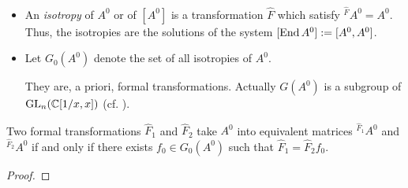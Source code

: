 \begin{defn}
  \begin{itemize}
    \item An \emph{isotropy} of $A^0$ or of $[A^0]$ is a transformation $\hat
      F$ which satisfy ${}^{\hat F}\!A^0=A^0$.
      Thus, the isotropies are the solutions of the system
      $[\operatorname{End} A^0]:=[A^0,A^0]$.
    \item Let $G_0(A^0)$ denote the set of all isotropies of $A^0$.
      \begin{s-rem}
        They are, a priori, formal transformations. Actually $G(A^0)$ is a
        subgroup of $\operatorname{GL}_n(\mathbb{C}[1/x,x])$ (cf. \TODO{}).
      \end{s-rem}
      \begin{comment}
        In the nice case this is only $T$?
      \end{comment}
  \end{itemize}
\end{defn}
\begin{lem}
  Two formal transformations $\hat F_1$ and $\hat F_2$ take $A^0$ into
  equivalent matrices ${}^{\hat F_1}\!A^0$ and  ${}^{\hat F_2}\!A^0$ if and
  only if there exists $f_0\in G_0(A^0)$ such that $\hat F_1=\hat F_2f_0$.
\end{lem}
\begin{proof}
  \TODO{}
\end{proof}

